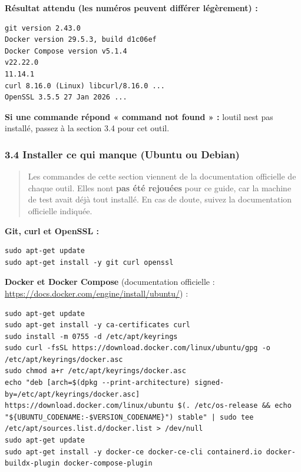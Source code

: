 \documentclass[
  french,
  11pt,
  a4paper,
]{article}
\begin{document}
\textbf{Résultat attendu (les numéros peuvent différer légèrement) :}

\begin{Verbatim}[breaklines=true,breakanywhere=true,fontsize=\small,frame=leftline,framerule=1.6pt,rulecolor=\color{credixblue},framesep=3mm,xleftmargin=2mm,xrightmargin=1mm]
git version 2.43.0
Docker version 29.5.3, build d1c06ef
Docker Compose version v5.1.4
v22.22.0
11.14.1
curl 8.16.0 (Linux) libcurl/8.16.0 ...
OpenSSL 3.5.5 27 Jan 2026 ...
\end{Verbatim}

\textbf{Si une commande répond « command not found » :}
l\textquotesingle outil n\textquotesingle est pas installé, passez à la
section 3.4 pour cet outil.

\subsubsection{3.4 Installer ce qui manque (Ubuntu ou
Debian)}\label{34-installer-ce-qui-manque-ubuntu-ou-debian}

\begin{quote}
Les commandes de cette section viennent de la documentation officielle
de chaque outil. Elles n\textquotesingle ont \textbf{pas été rejouées}
pour ce guide, car la machine de test avait déjà tout installé. En cas
de doute, suivez la documentation officielle indiquée.
\end{quote}

\textbf{Git, curl et OpenSSL :}

\begin{Verbatim}[breaklines=true,breakanywhere=true,fontsize=\small,frame=leftline,framerule=1.6pt,rulecolor=\color{credixblue},framesep=3mm,xleftmargin=2mm,xrightmargin=1mm]
sudo apt-get update
sudo apt-get install -y git curl openssl
\end{Verbatim}

\textbf{Docker et Docker Compose} (documentation officielle :
\url{https://docs.docker.com/engine/install/ubuntu/}) :

\begin{Verbatim}[breaklines=true,breakanywhere=true,fontsize=\small,frame=leftline,framerule=1.6pt,rulecolor=\color{credixblue},framesep=3mm,xleftmargin=2mm,xrightmargin=1mm]
sudo apt-get update
sudo apt-get install -y ca-certificates curl
sudo install -m 0755 -d /etc/apt/keyrings
sudo curl -fsSL https://download.docker.com/linux/ubuntu/gpg -o /etc/apt/keyrings/docker.asc
sudo chmod a+r /etc/apt/keyrings/docker.asc
echo "deb [arch=$(dpkg --print-architecture) signed-by=/etc/apt/keyrings/docker.asc] https://download.docker.com/linux/ubuntu $(. /etc/os-release && echo "${UBUNTU_CODENAME:-$VERSION_CODENAME}") stable" | sudo tee /etc/apt/sources.list.d/docker.list > /dev/null
sudo apt-get update
sudo apt-get install -y docker-ce docker-ce-cli containerd.io docker-buildx-plugin docker-compose-plugin
\end{Verbatim}
\end{document}
